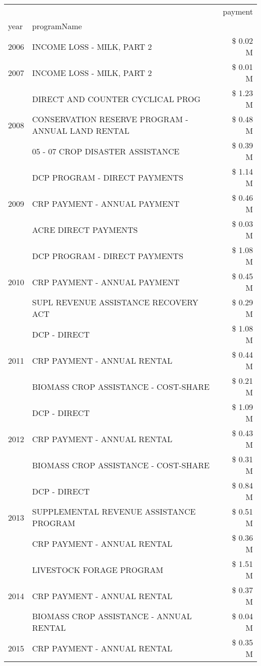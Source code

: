\begin{tabular}{llr}
\toprule
 &  & payment \\
year & programName &  \\
\midrule
2006 & INCOME LOSS - MILK, PART 2 & \$ 0.02 M \\
\cline{1-3}
2007 & INCOME LOSS - MILK, PART 2 & \$ 0.01 M \\
\cline{1-3}
\multirow[t]{3}{*}{2008} & DIRECT AND COUNTER CYCLICAL PROG & \$ 1.23 M \\
 & CONSERVATION RESERVE PROGRAM - ANNUAL LAND RENTAL & \$ 0.48 M \\
 & 05 - 07 CROP DISASTER ASSISTANCE & \$ 0.39 M \\
\cline{1-3}
\multirow[t]{3}{*}{2009} & DCP PROGRAM - DIRECT PAYMENTS & \$ 1.14 M \\
 & CRP PAYMENT - ANNUAL PAYMENT & \$ 0.46 M \\
 & ACRE DIRECT PAYMENTS & \$ 0.03 M \\
\cline{1-3}
\multirow[t]{3}{*}{2010} & DCP PROGRAM - DIRECT PAYMENTS & \$ 1.08 M \\
 & CRP PAYMENT - ANNUAL PAYMENT & \$ 0.45 M \\
 & SUPL REVENUE ASSISTANCE RECOVERY ACT & \$ 0.29 M \\
\cline{1-3}
\multirow[t]{3}{*}{2011} & DCP - DIRECT & \$ 1.08 M \\
 & CRP PAYMENT - ANNUAL RENTAL & \$ 0.44 M \\
 & BIOMASS CROP ASSISTANCE - COST-SHARE & \$ 0.21 M \\
\cline{1-3}
\multirow[t]{3}{*}{2012} & DCP - DIRECT & \$ 1.09 M \\
 & CRP PAYMENT - ANNUAL RENTAL & \$ 0.43 M \\
 & BIOMASS CROP ASSISTANCE - COST-SHARE & \$ 0.31 M \\
\cline{1-3}
\multirow[t]{3}{*}{2013} & DCP - DIRECT & \$ 0.84 M \\
 & SUPPLEMENTAL REVENUE ASSISTANCE PROGRAM & \$ 0.51 M \\
 & CRP PAYMENT - ANNUAL RENTAL & \$ 0.36 M \\
\cline{1-3}
\multirow[t]{3}{*}{2014} & LIVESTOCK FORAGE PROGRAM & \$ 1.51 M \\
 & CRP PAYMENT - ANNUAL RENTAL & \$ 0.37 M \\
 & BIOMASS CROP ASSISTANCE - ANNUAL RENTAL & \$ 0.04 M \\
\cline{1-3}
\multirow[t]{3}{*}{2015} & CRP PAYMENT - ANNUAL RENTAL & \$ 0.35 M \\

\end{tabular}
